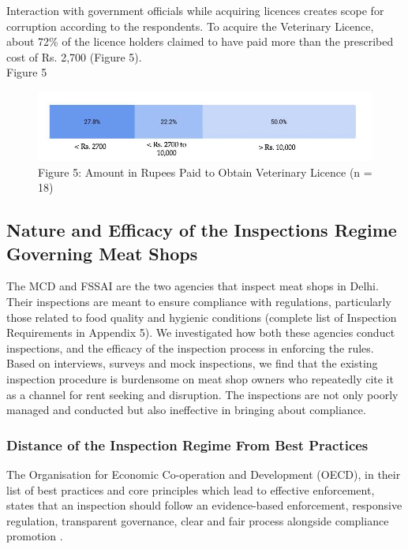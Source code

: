 \documentclass[a4paper, 12pt]{article}
\begin{document}
Interaction with government officials while acquiring licences creates scope for corruption according to the respondents. To acquire the Veterinary Licence, about 72\% of the licence holders claimed to have paid more than the prescribed cost of Rs. 2,700 (Figure 5).\\

Figure 5
\begin{figure}[H]
\centering
\includegraphics{Fig 5.jpg}
\caption[Optional Caption]{Figure 5: Amount in Rupees Paid to Obtain Veterinary Licence (n = 18)}
\end{figure} 

\subsection{Nature and Efficacy of the Inspections Regime Governing Meat Shops}

The MCD and FSSAI are the two agencies that inspect meat shops in Delhi. Their inspections are meant to ensure compliance with regulations, particularly those related to food quality and hygienic conditions (complete list of Inspection Requirements in Appendix 5). We investigated how both these agencies conduct inspections, and the efficacy of the inspection process in enforcing the rules. Based on interviews, surveys and mock inspections, we find that the existing inspection procedure is burdensome on meat shop owners who repeatedly cite it as a channel for rent seeking and disruption. The inspections are not only poorly managed and conducted but also ineffective in bringing about compliance. \\

\subsubsection{Distance of the Inspection Regime From Best Practices}

The Organisation for Economic Co-operation and Development (OECD), in their list of best practices and core principles which lead to effective enforcement, states that an inspection should follow an evidence-based enforcement, responsive regulation, transparent governance, clear and fair process alongside compliance promotion \parencite{oecd1report}. \\
\end{document}
